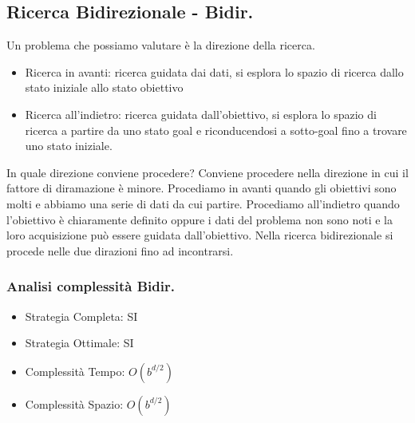 \documentclass{article}
\begin{document}
\subsection{Ricerca Bidirezionale - Bidir.}
Un problema che possiamo valutare è la direzione della ricerca.
\begin{itemize}
    \item Ricerca in avanti: ricerca guidata dai dati, si esplora lo spazio di ricerca dallo stato iniziale allo stato obiettivo
    \item Ricerca all'indietro: ricerca guidata dall'obiettivo, si esplora lo spazio di ricerca a partire da uno stato goal e riconducendosi a sotto-goal fino a trovare uno stato iniziale.
\end{itemize}
In quale direzione conviene procedere? Conviene procedere nella direzione in cui il fattore di diramazione è minore. Procediamo in avanti quando gli obiettivi sono molti e abbiamo una serie di dati da cui partire. Procediamo all'indietro quando l'obiettivo è chiaramente definito oppure i dati del problema non sono noti e la loro acquisizione può essere guidata dall'obiettivo. \newline
Nella ricerca bidirezionale si procede nelle due dirazioni fino ad incontrarsi.
\subsubsection{Analisi complessità Bidir.}
\begin{itemize}
    \item Strategia Completa: SI
    \item Strategia Ottimale: SI
    \item Complessità Tempo: $O(b^{d/2})$
    \item Complessità Spazio: $O(b^{d/2})$
\end{itemize}
\end{document}
